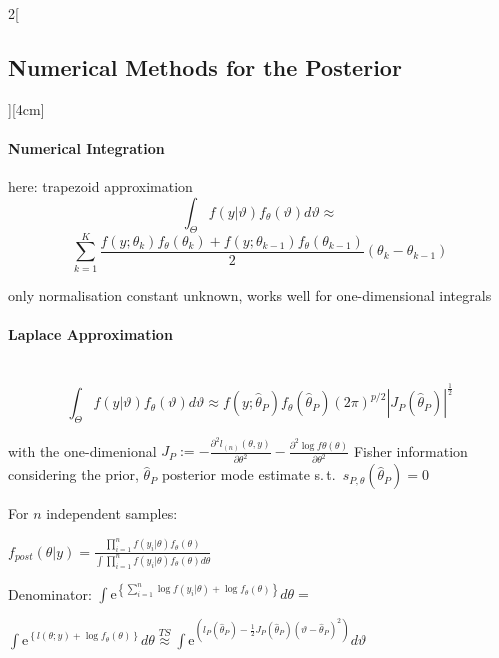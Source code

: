 \documentclass[8pt]{extarticle}
\begin{document}
\begin{multicols}{2}[\subsection{Numerical Methods for the Posterior}][4cm]

\paragraph{Numerical Integration} here: trapezoid approximation
$$\int_\Theta f(y|\vartheta)f_\theta(\vartheta)d\vartheta\approx$$ $$  \sum_{k=1}^K \frac{f(y;\theta_k)f_\theta(\theta_k) + f(y;\theta_{k-1})f_\theta(\theta_{k-1})}{2}(\theta_k {-} \theta_{k-1})$$

 \noindent only normalisation constant unknown, works well for one-dimensional integrals


\paragraph{Laplace Approximation} \ \\

$$\int_\Theta f(y|\vartheta)f_\theta(\vartheta)d\vartheta \approx f(y;\hat{\theta}_P) f_\theta(\hat{\theta}_P)(2\pi)^{p/2}\left|J_{P}(\hat{\theta}_P)\right|^{\frac{1}{2}}$$

\noindent with the one-dimenional $J_{P} := {-}\frac{\partial^2 l_{(n)}(\theta,y)}{\partial \theta^2} {-} \frac{\partial^2 \log f\theta(\theta)}{\partial\theta^2}$ Fisher information considering the prior, $\hat{\theta}_P$ posterior mode estimate s.\,t.\ $s_{P,\theta}(\hat{\theta}_P)=0$

\begin{Proof}
For $n$ independent samples:\vspace{0.2em}

$f_{post}(\theta|y)=\frac{\prod_{i=1}^n f(y_i|\theta)f_\theta(\theta)}{\int \prod_{i=1}^n f(y_i|\theta)f_\theta(\theta)d\theta}$
\vspace{0.6em}

\noindent Denominator:\vspace{0.2em}
\vspace{0.2em}
$\int \mathrm{e}^{\left\{ \sum_{i=1}^n \log f(y_i|\theta) + \log f_\theta(\theta)\right\}} d\theta =$ 

\noindent $ \int \mathrm{e}^{\left\{ l(\theta;y){+}\log f_\theta(\theta) \right\}} d\theta \overset{TS}{\approx} \int \mathrm{e}^{(l_P(\hat{\theta}_P) {-} \frac{1}{2} J_P(\hat{\theta}_P)(\vartheta {-}\hat{\theta}_P)^2)}d\vartheta$
\vspace{0.6em}


\end{Proof}
\end{multicols}
\end{document}
